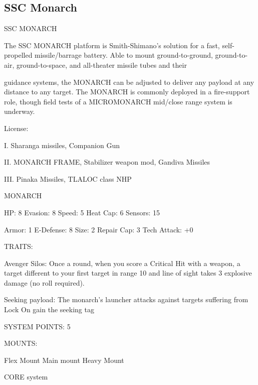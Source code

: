 \subsection{SSC Monarch}

                                             SSC MONARCH   

The SSC MONARCH platform is Smith-Shimano’s solution for a fast, self-propelled missile/barrage battery.  
Able to mount ground-to-ground, ground-to-air, ground-to-space, and all-theater missile tubes and their  

guidance systems, the MONARCH can be adjusted to deliver any payload at any distance to any target.  
The MONARCH is commonly deployed in a fire-support role, though field tests of a MICROMONARCH  
mid/close range system is underway. 
 
                                                     License:
 
I. Sharanga missiles, Companion Gun
 
II. MONARCH FRAME, Stabilizer weapon mod, Gandiva Missiles
 
III. Pinaka Missiles, TLALOC class NHP
 

                                                    MONARCH 

  HP: 8           Evasion: 8                             Speed: 5            Heat Cap: 6         Sensors: 15 

  Armor: 1        E-Defense: 8                           Size: 2             Repair Cap: 3       Tech Attack:  
                                                                                                 +0 

                                                      TRAITS: 

  Avenger Silos: Once a round, when you score a Critical Hit with a weapon, a target different to your  
  first target in range 10 and line of sight takes 3 explosive damage (no roll required).
 
  Seeking payload: The monarch’s launcher attacks against targets suffering from Lock On gain the  
  seeking tag 

                                               SYSTEM POINTS: 5 

                                                     MOUNTS: 

   Flex Mount                         Main mount                             Heavy Mount 

                                                   CORE system 

